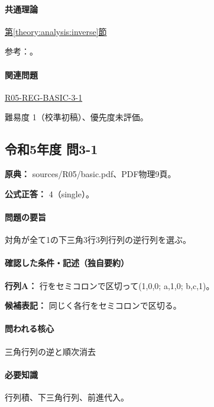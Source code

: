 \paragraph{共通理論} \hyperref[theory:analysis:inverse]{第\ref*{theory:analysis:inverse}節}

\par 参考：\cite{mit_inverse2007}。

\paragraph{関連問題} \hyperref[q:r05-reg-basic-3-1]{R05-REG-BASIC-3-1}

\par 難易度 1（校準初稿）、優先度未評価。

\subsection{令和5年度 問3-1}
\label{q:r05-reg-basic-3-1}

\noindent\textbf{原典：} sources/R05/basic.pdf、PDF物理9頁。

\textbf{公式正答：} 4（single）。

\paragraph{問題の要旨} 対角が全て1の下三角3行3列行列の逆行列を選ぶ。

\paragraph{確認した条件・記述（独自要約）}\mbox{}\par

\noindent\textbf{行列A：} 行をセミコロンで区切って(1,0,0; a,1,0; b,c,1)。\par

\noindent\textbf{候補表記：} 同じく各行をセミコロンで区切る。\par

\paragraph{問われる核心} 三角行列の逆と順次消去

\paragraph{必要知識} 行列積、下三角行列、前進代入。

